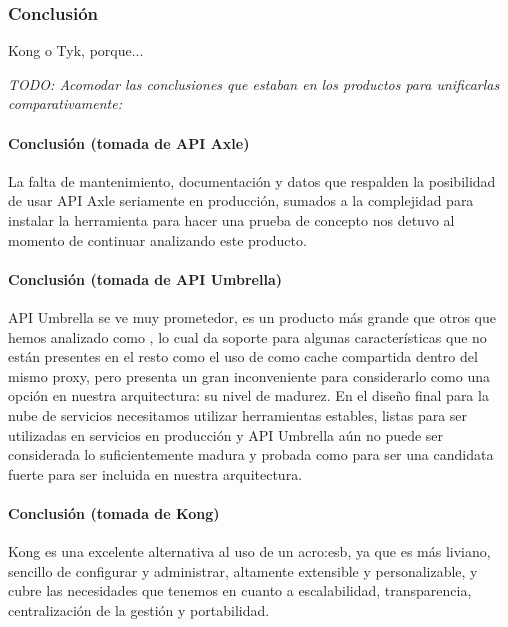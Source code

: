 \subsubsection{Conclusión}

Kong o Tyk, porque...

\textit{TODO: Acomodar las conclusiones que estaban en los productos para unificarlas comparativamente:}

\paragraph{Conclusión (tomada de API Axle)}

La falta de mantenimiento, documentación y datos que respalden la posibilidad de usar API Axle seriamente en producción, sumados a la complejidad para instalar la herramienta para hacer una prueba de concepto nos detuvo al momento de continuar analizando este producto.

\paragraph{Conclusión (tomada de API Umbrella)}

API Umbrella se ve muy prometedor, es un producto más grande que otros que hemos analizado como , lo cual da soporte para algunas características que no están presentes en el resto como el uso de  como cache compartida dentro del mismo proxy, pero presenta un gran inconveniente para considerarlo como una opción en nuestra arquitectura: su nivel de madurez. En el diseño final para la nube de servicios necesitamos utilizar herramientas estables, listas para ser utilizadas en servicios en producción y API Umbrella aún no puede ser considerada lo suficientemente madura y probada como para ser una candidata fuerte para ser incluida en nuestra arquitectura.

\paragraph{Conclusión (tomada de Kong)}

Kong es una excelente alternativa al uso de un \gls{acro:esb}, ya que es más liviano, sencillo de configurar y administrar, altamente extensible y personalizable, y cubre las necesidades que tenemos en cuanto a escalabilidad, transparencia, centralización de la gestión y portabilidad.
